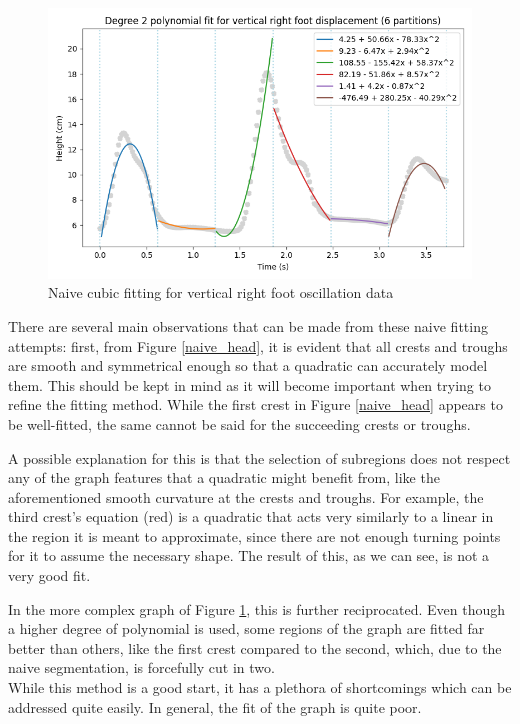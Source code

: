 \documentclass[12pt, a4paper]{article}
\begin{document}
\begin{figure}[H]
    \centering
    \includegraphics[width=12cm]{p_naive_right_3.png}
    \caption{Naive cubic fitting for vertical right foot oscillation data}
    \label{naive_right}
\end{figure}

There are several main observations that can be made from these naive fitting
attempts: first, from Figure \ref{naive_head}, it is evident that all crests and
troughs are smooth and symmetrical enough so that a quadratic can accurately
model them. This should be kept in mind as it will become important when trying
to refine the fitting method. While the first crest in Figure \ref{naive_head}
appears to be well-fitted, the same cannot be said for the succeeding crests or
troughs.

A possible explanation for this is that the selection of subregions does not
respect any of the graph features that a quadratic might benefit from, like the
aforementioned smooth curvature at the crests and troughs. For example, the
third crest's equation (red) is a quadratic that acts very similarly to a linear
in the region it is meant to approximate, since there are not enough turning
points for it to assume the necessary shape. The result of this, as we can see,
is not a very good fit.

In the more complex graph of Figure \ref{naive_right}, this is further
reciprocated. Even though a higher degree of polynomial is used, some regions of
the graph are fitted far better than others, like the first crest compared to
the second, which, due to the naive segmentation, is forcefully cut in two.  \\

While this method is a good start, it has a plethora of shortcomings which can
be addressed quite easily. In general, the fit of the graph is quite poor.
\end{document}
